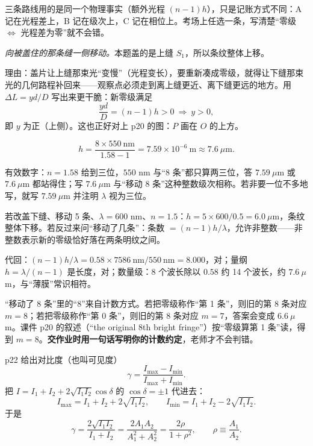 \documentclass[11pt]{ctexart}
\begin{document}
三条路线用的是同一个物理事实（额外光程 $(n-1)h$），只是记账方式不同：A 记在光程差上，B 记在级次上，C 记在相位上。考场上任选一条，写清楚“零级 $\Leftrightarrow$ 光程差为零”就不会错。


\emph{向被盖住的那条缝一侧移动。}本题盖的是上缝 $S_1$，所以条纹整体上移。

理由：盖片让上缝那束光“变慢”（光程变长），要重新凑成零级，就得让下缝那束光的几何路程补回来——观察点必须走到离上缝更近、离下缝更远的地方。用 $\Delta L=yd/D$ 写出来更干脆：新零级满足
\[
\frac{yd}{D}=(n-1)h>0\ \Longrightarrow\ y>0 ,
\]
即 $y$ 为正（上侧）。这也正好对上 p20 的图：$P$ 画在 $O$ 的上方。

\[
h=\frac{8\times550\ \mathrm{nm}}{1.58-1}=7.59\times10^{-6}\ \mathrm{m}\approx7.6\ \mu\mathrm{m}.
\]

有效数字：$n=1.58$ 给到三位，$550$ nm 与“8 条”都只算两三位，答 $7.59\ \mu$m 或 $7.6\ \mu$m 都站得住；写 $7.6\ \mu$m 与“移动 8 条”这种整数级次相称。若非要一位不多地写，就写 $7.59\ \mu$m 并注明 $\lambda$ 视为三位。


若改盖下缝、移动 5 条、$\lambda=600$ nm、$n=1.5$：$h=5\times600/0.5=6.0\ \mu$m，条纹整体下移。若反过来问“移动了几条”：条数 $=(n-1)h/\lambda$，允许非整数——非整数表示新的零级恰好落在两条明纹之间。

代回：$(n-1)h/\lambda=0.58\times7586\ \mathrm{nm}/550\ \mathrm{nm}=8.000$，对；量纲 $h=\lambda/(n-1)$ 是长度，对；数量级：8 个波长除以 $0.58$ 约 14 个波长，约 $7.6\ \mu$m，与“薄膜”常识相符。


“移动了 8 条”里的“8”来自计数方式。若把零级称作“第 1 条”，则旧的第 8 条对应 $m=8$；若把零级称作“第 0 条”，则旧的第 8 条对应 $m=7$，答案会变成 $6.6\ \mu$m。课件 p20 的叙述（“the original 8th bright fringe”）按“零级算第 1 条”读，得到 $m=8$。\textbf{交作业时用一句话写明你的计数约定}，老师才不会判错。

\flowerrule


p22 给出对比度（也叫可见度）
\[
\gamma=\frac{I_{\max}-I_{\min}}{I_{\max}+I_{\min}} .
\]
把 $I=I_1+I_2+2\sqrt{I_1I_2}\cos\delta$ 的 $\cos\delta=\pm1$ 代进去：
\[
I_{\max}=I_1+I_2+2\sqrt{I_1I_2},\qquad I_{\min}=I_1+I_2-2\sqrt{I_1I_2}.
\]
于是
\[
\gamma=\frac{2\sqrt{I_1I_2}}{I_1+I_2}=\frac{2A_1A_2}{A_1^{2}+A_2^{2}}=\frac{2\rho}{1+\rho^{2}},\qquad
\rho\equiv\frac{A_1}{A_2}.
\]
\end{document}
